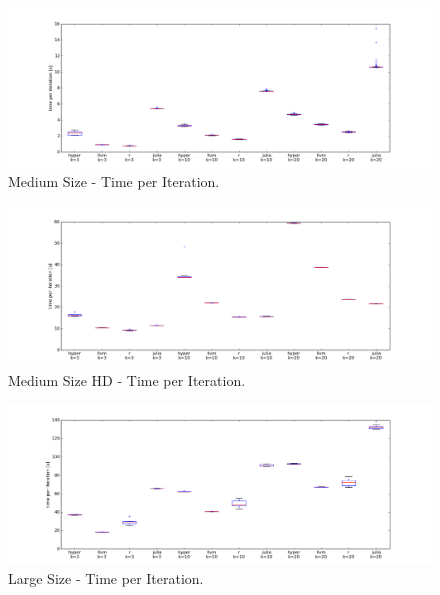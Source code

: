 \begin{figure}[htsb]
  \raggedleft
  \includegraphics[scale=0.4, trim="0cm 1cm 0cm 0cm"]{figures/charts/15M_all}
  \caption[Medium Size - Time per Iteration]{Medium Size - Time per Iteration.}
  \label{fig:15M_all}
\end{figure}


\begin{figure}[htsb]
  \raggedleft
  \includegraphics[scale=0.4, trim="0cm 1cm 0cm 0cm"]{figures/charts/15Mxhd_all}
  \caption[Medium Size HD - Time per Iteration]{Medium Size HD - Time per Iteration.}
  \label{fig:15Mxhd_all}
\end{figure}


\begin{figure}[htsb]
  \raggedleft
  \includegraphics[scale=0.4, trim="0cm 1cm 0cm 0cm"]{figures/charts/150M_all}
  \caption[Large Size - Time per Iteration]{Large Size - Time per Iteration.}
  \label{fig:150M_all}
\end{figure}



